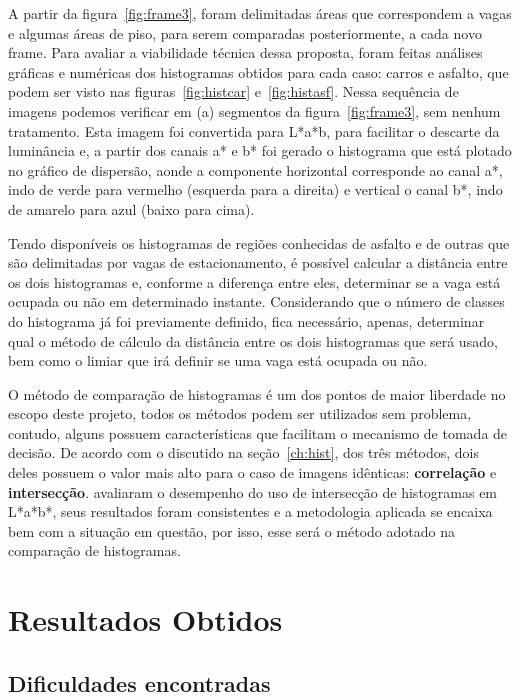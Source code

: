 \documentclass[ecp,tc]{iiufrgs}
\begin{document}
A partir da figura~\ref{fig:frame3}, foram delimitadas áreas que correspondem a vagas e algumas áreas de piso, para serem comparadas posteriormente, a cada novo frame. Para avaliar a viabilidade técnica dessa proposta, foram feitas análises gráficas e numéricas dos histogramas obtidos para cada caso: carros e asfalto, que podem ser visto nas figuras~\ref{fig:histcar} e~\ref{fig:histasf}. Nessa sequência de imagens podemos verificar em (a) segmentos da figura~\ref{fig:frame3}, sem nenhum tratamento. Esta imagem foi convertida para L*a*b, para facilitar o descarte da luminância e, a partir dos canais a* e b* foi gerado o histograma que está plotado no gráfico de dispersão, aonde a componente horizontal corresponde ao canal a*, indo de verde para vermelho (esquerda para a direita) e vertical o canal b*, indo de amarelo para azul (baixo para cima).

Tendo disponíveis os histogramas de regiões conhecidas de asfalto e de outras que são delimitadas por vagas de estacionamento, é possível calcular a distância entre os dois histogramas e, conforme a diferença entre eles, determinar se a vaga está ocupada ou não em determinado instante. Considerando que o número de classes do histograma já foi previamente definido, fica necessário, apenas, determinar qual o método de cálculo da distância entre os dois histogramas que será usado, bem como o limiar que irá definir se uma vaga está ocupada ou não.

O método de comparação de histogramas é um dos pontos de maior liberdade no escopo deste projeto, todos os métodos podem ser utilizados sem problema, contudo, alguns possuem características que facilitam o mecanismo de tomada de decisão. De acordo com o discutido na seção~\ref{ch:hist}, dos três métodos, dois deles possuem o valor mais alto para o caso de imagens idênticas: \textbf{correlação} e \textbf{intersecção}.  avaliaram o desempenho do uso de intersecção de histogramas em L*a*b*, seus resultados foram consistentes e a metodologia aplicada se encaixa bem com a situação em questão, por isso, esse será o método adotado na comparação de histogramas.

\chapter{Resultados Obtidos}

\section{Dificuldades encontradas}
\end{document}
